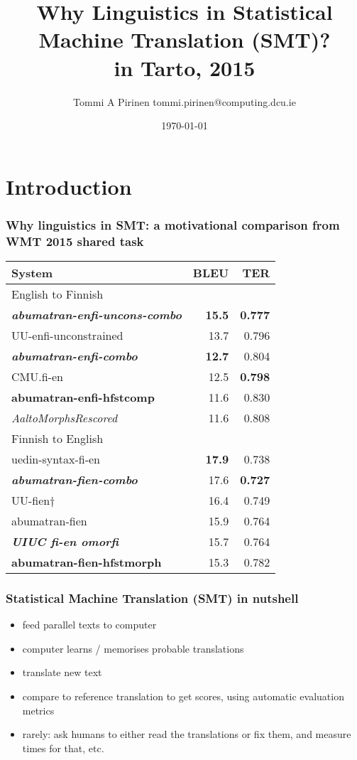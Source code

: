 \documentclass{beamer}
\title{Why Linguistics in Statistical Machine Translation (SMT)?\\
\scriptsize{in Tarto, 2015}}
\author{Tommi A Pirinen \scriptsize \guilsinglleft{}tommi.pirinen@computing.dcu.ie\guilsinglright{}}
\institute{DCU, ADAPT--CNGL\\Abumatran}
\date{\today}
\begin{document}

\maketitle

\section{Introduction}

\begin{frame}
    \frametitle{Why linguistics in SMT: a motivational comparison from
    WMT 2015 shared task}
    \tiny{
                    \begin{tabular}{|l|r|r|}
                        \hline
    \bf System & \bf BLEU & \bf TER \\
    \hline
    English to Finnish \\
    \bf \em abumatran-enfi-uncons-combo & \bf 15.5 & \bf 0.777 \\
    UU-enfi-unconstrained  & 13.7 & 0.796 \\
    \hline
    \bf \em abumatran-enfi-combo  & \bf 12.7 & 0.804 \\
    CMU.fi-en  & 12.5 & \bf 0.798 \\
    \bf abumatran-enfi-hfstcomp & 11.6 & 0.830 \\
    \em AaltoMorphsRescored & 11.6 & 0.808 \\
Finnish to English \\
    \hline
    uedin-syntax-fi-en & \bf 17.9 & 0.738 \\
    \bf \em abumatran-fien-combo  & 17.6 & \bf 0.727 \\
    UU-fien$\dagger$ & 16.4 & 0.749 \\
    abumatran-fien & 15.9 & 0.764 \\
    \bf \em UIUC fi-en omorfi & 15.7 & 0.764 \\
    \bf abumatran-fien-hfstmorph & 15.3 & 0.782 \\
    \hline
\end{tabular}
    }
\end{frame}

\begin{frame}
    \frametitle{Statistical Machine Translation (SMT) in nutshell}
    \begin{itemize}
        \item feed parallel texts to computer
        \item computer learns / memorises probable translations
        \item translate new text
        \item compare to reference translation to get scores, using automatic
            evaluation metrics
        \item rarely: ask humans to either read the translations or fix them,
            and measure times for that, etc.
    \end{itemize}
\end{frame}
\end{document}
